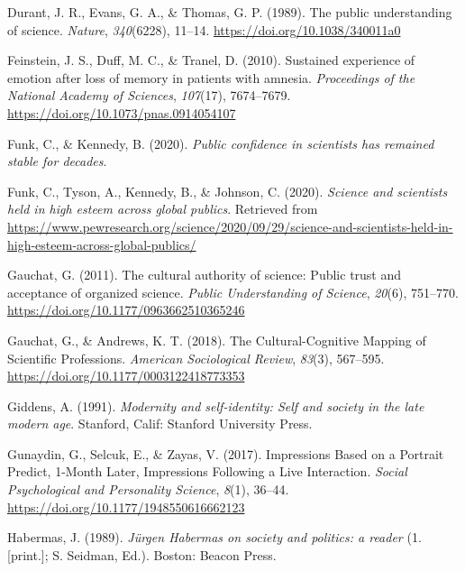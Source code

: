 \documentclass[
  doc,floatsintext]{apa6}
\newlength{\cslhangindent}
\newenvironment{CSLReferences}[2] %
 {\begin{list}{}{%
  \setlength{\itemindent}{0pt}
  \setlength{\leftmargin}{0pt}
  \setlength{\parsep}{0pt}
  \ifodd #1
   \setlength{\leftmargin}{\cslhangindent}
   \setlength{\itemindent}{-1\cslhangindent}
  \fi
  \setlength{\itemsep}{#2\baselineskip}}}
 {\end{list}}
\begin{document}
\begin{CSLReferences}{1}{0}
Durant, J. R., Evans, G. A., \& Thomas, G. P. (1989). The public understanding of science. \emph{Nature}, \emph{340}(6228), 11--14. \url{https://doi.org/10.1038/340011a0}

Feinstein, J. S., Duff, M. C., \& Tranel, D. (2010). Sustained experience of emotion after loss of memory in patients with amnesia. \emph{Proceedings of the National Academy of Sciences}, \emph{107}(17), 7674--7679. \url{https://doi.org/10.1073/pnas.0914054107}

Funk, C., \& Kennedy, B. (2020). \emph{Public confidence in scientists has remained stable for decades}.

Funk, C., Tyson, A., Kennedy, B., \& Johnson, C. (2020). \emph{Science and scientists held in high esteem across global publics}. Retrieved from \url{https://www.pewresearch.org/science/2020/09/29/science-and-scientists-held-in-high-esteem-across-global-publics/}

Gauchat, G. (2011). The cultural authority of science: Public trust and acceptance of organized science. \emph{Public Understanding of Science}, \emph{20}(6), 751--770. \url{https://doi.org/10.1177/0963662510365246}

Gauchat, G., \& Andrews, K. T. (2018). The Cultural-Cognitive Mapping of Scientific Professions. \emph{American Sociological Review}, \emph{83}(3), 567--595. \url{https://doi.org/10.1177/0003122418773353}

Giddens, A. (1991). \emph{Modernity and self-identity: Self and society in the late modern age}. Stanford, Calif: Stanford University Press.

Gunaydin, G., Selcuk, E., \& Zayas, V. (2017). Impressions Based on a Portrait Predict, 1-Month Later, Impressions Following a Live Interaction. \emph{Social Psychological and Personality Science}, \emph{8}(1), 36--44. \url{https://doi.org/10.1177/1948550616662123}

Habermas, J. (1989). \emph{Jürgen Habermas on society and politics: a reader} (1. {[}print.{]}; S. Seidman, Ed.). Boston: Beacon Press.


\end{CSLReferences}
\end{document}
